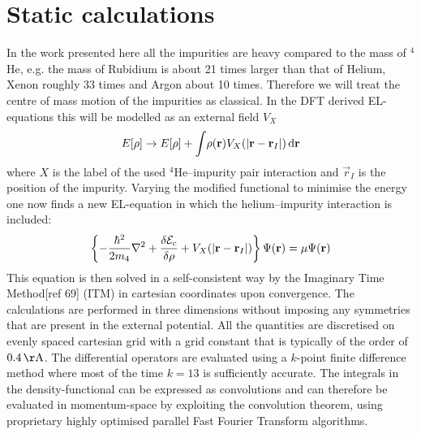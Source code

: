 	\section{Static calculations}
		In the work presented here all the impurities are heavy compared to the mass of $^4$He, e.g. the mass of Rubidium is about 21 times larger than that of Helium, Xenon roughly 33 times and Argon about 10 times. Therefore we will treat the centre of mass motion of the impurities as classical. In the DFT derived EL-equations this will be modelled as an external field $V_X$
		\begin{align}
			E[\rho] \rightarrow E[\rho] +  \int\!\rho({\mathbf r}) V_X\qty(\abs{{\mathbf r} - {\mathbf r}_I})\,\mathrm{d}{\bm{\mathrm{r}}} \label{eq:el-static-hi}
		\end{align}
		where $X$ is the label of the used $^4$He--impurity pair interaction and ${\vec r}_I$ is the position of the impurity. Varying the modified functional to minimise the energy one now finds a new EL-equation in which the helium--impurity interaction is included:
		\begin{align}
			\left\{-\frac{\hbar^2}{2m_4} \laplacian + \fdv{\mathcal{E}_c}{\rho} + V_X(|{\mathbf r} - {\mathbf r_I}|)\right\}\Psi({\mathbf r}) = \mu \Psi({\mathbf r}) \label{eq:el-static-hi}
		\end{align}
		This equation is then solved in a self-consistent way by the Imaginary Time Method[ref 69] (ITM) in cartesian coordinates upon convergence. The calculations are performed in three dimensions without imposing any symmetries that are present in the external potential. All the quantities are discretised on evenly spaced cartesian grid with a grid constant that is typically of the order of $0.4\unit{\AA}$. The differential operators are evaluated using a $k$-point finite difference method where most of the time $k=13$ is sufficiently accurate. The integrals in the density-functional can be expressed as convolutions and can therefore be evaluated in momentum-space by exploiting the convolution theorem, using proprietary highly optimised parallel Fast Fourier Transform algorithms. 
			
